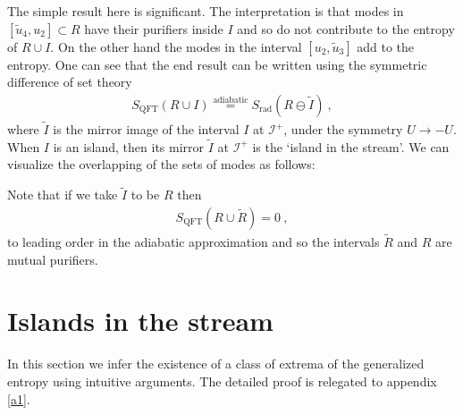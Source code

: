 \documentclass[12pt]{article}
\newcommand{\EQ}[1]{\begin{equation}\begin{split} #1
\end{split}\end{equation}}
\begin{document}
The simple result here is significant. The interpretation is that modes in $[\tilde u_4,u_2]\subset R$ have their purifiers inside $I$ and so do not contribute to the entropy of $R\cup I$. On the other hand the modes in the interval $[u_2,\tilde u_3]$ add to the entropy. One can see that the end result can be written using the symmetric difference of set theory
\EQ{
S_\text{QFT}(R\cup I)\overset{\text{adiabatic}}=S_\text{rad}(R\ominus\tilde I)\ ,
\label{vzz}
}
where $\tilde I$ is the mirror image of the interval $I$ at $\mathscr I^+$, under the symmetry $U\to-U$. When $I$ is an island, then its mirror $\tilde I$ at $\mathscr I^+$ is the  `island in the stream'. We can visualize the overlapping of the sets of modes as follows:
{\small\begin{center}
\end{center}}
Note that if we take $\tilde I$ to be $R$ then 
\EQ{
S_\text{QFT}(R\cup \tilde R)=0\ ,
}
to leading order in the adiabatic approximation
and so the intervals $\tilde R$ and $R$ are mutual purifiers.

\section{Islands in the stream}\label{s3}

In this section we infer the existence of a class of extrema of the generalized entropy using intuitive arguments. The detailed proof is relegated to appendix \ref{a1}. 
\end{document}
